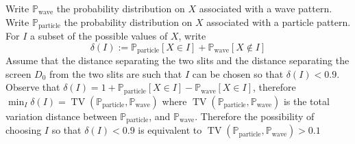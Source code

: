 \documentclass[11pt]{article}
\renewcommand{\P}{\mathbb{P}}
\newcommand{\pa}{\text{particle}}
\newcommand{\wa}{\text{wave}}
\theoremstyle{definition}
\begin{document}
Write $\P_\wa$ the probability distribution on $X$ associated with a wave pattern.  Write $\P_\pa$ the probability distribution on $X$ associated with a particle pattern.
For $I$ a subset of the possible values of $X$, write
\begin{equation}\label{eqkjhjhhkj}
\delta(I):=\P_\pa[X\in I]+ \P_\wa[X\not \in I]
\end{equation}
Assume that the distance separating the two slits and the distance separating the screen $D_0$ from the two slits are such that $I$ can be chosen so that $\delta(I)<0.9$. Observe that $\delta(I)=1+\P_\pa[X\in I]- \P_\wa[X \in I]$, therefore $\min_{I}\delta(I)=\operatorname{TV}(\P_\pa,\P_\wa)$ where $\operatorname{TV}(\P_\pa,\P_\wa)$ is the total variation distance between $\P_\pa$, and $\P_\wa$. Therefore  the possibility of choosing $I$ so that $\delta(I)<0.9$ is equivalent to $\operatorname{TV}(\P_\pa,\P_\wa)>0.1$
\end{document}
